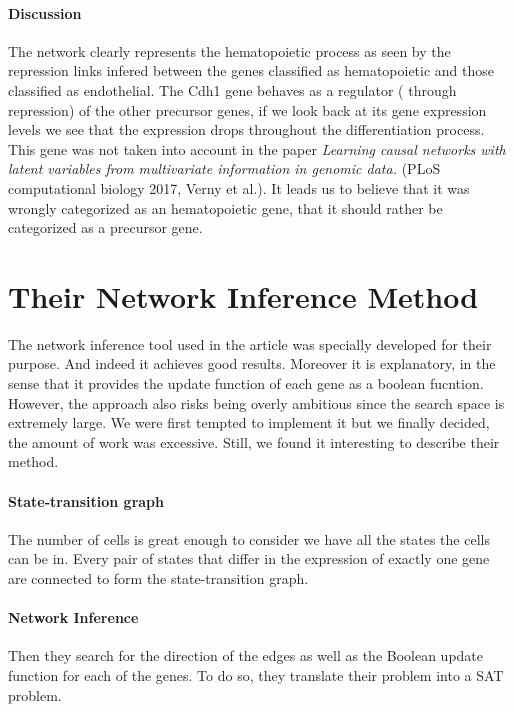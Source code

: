 \documentclass[a4paper,12pt]{book}
\theoremstyle{break}
\begin{document}
\paragraph{Discussion }The network clearly represents the hematopoietic process as seen by the repression links  infered between the genes classified as hematopoietic and those classified as endothelial. The Cdh1 gene behaves as a regulator ( through repression) of the other precursor genes, if we look back at its gene expression levels we see that the expression drops throughout the differentiation process. This gene was not taken into account in the paper \textit{Learning causal networks with latent variables from multivariate information in genomic data.} (PLoS computational biology 2017, Verny et al.). It leads us to believe that it was wrongly categorized as an hematopoietic gene, that it should rather be categorized as a precursor gene.

\section*{Their Network Inference Method}
The network inference tool used in the article was specially developed for their purpose. And indeed it achieves good results. Moreover it is explanatory, in the sense that it provides the update function of each gene as a boolean fucntion. However, the approach also risks being overly ambitious since the search space is extremely large. We were first tempted to implement it but we finally decided, the amount of work was excessive. Still, we found it interesting to describe their method.

\paragraph{State-transition graph} 
The number of cells is great enough to consider we have all the states the cells can be in. Every pair of states that differ in the expression of exactly one gene are connected to form the state-transition graph.
\paragraph{Network Inference}
Then they search for the direction of the edges as well as the Boolean update function for each of the genes. To do so, they translate their problem into a SAT problem.
\end{document}
